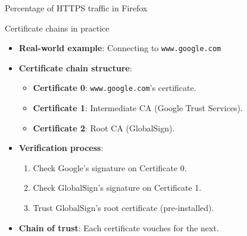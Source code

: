 \documentclass[aspectratio=169, lualatex,  10pt,dvipsnames,svgnames]{beamer} %
\begin{document}
\begin{frame}{Percentage of HTTPS traffic in Firefox}
\end{frame}

\begin{frame}{Certificate chains in practice}
	\begin{itemize}
		\item \textbf{Real-world example}: Connecting to \texttt{www.google.com}
		\item \textbf{Certificate chain structure}:
		      \begin{itemize}
			      \item \textbf{Certificate 0}: \texttt{www.google.com}'s certificate.
			      \item \textbf{Certificate 1}: Intermediate CA (Google Trust Services).
			      \item \textbf{Certificate 2}: Root CA (GlobalSign).
		      \end{itemize}
		\item \textbf{Verification process}:
		      \begin{enumerate}
			      \item Check Google's signature on Certificate 0.\pause
			      \item Check GlobalSign's signature on Certificate 1.\pause
			      \item Trust GlobalSign's root certificate (pre-installed).\pause
		      \end{enumerate}
		\item \textbf{Chain of trust}: Each certificate vouches for the next.
	\end{itemize}
\end{frame}
\end{document}
